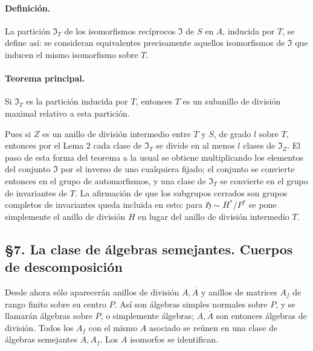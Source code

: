 \paragraph{Definición.}
La partición \(\mathfrak I_T\) de los isomorfismos recíprocos \(\mathfrak I\) de \(S\) en \(A\), inducida por \(T\), se define así: se consideran equivalentes precisamente aquellos isomorfismos de \(\mathfrak I\) que inducen el mismo isomorfismo sobre \(T\).

\paragraph{Teorema principal.}
Si \(\mathfrak I_T\) es la partición inducida por \(T\), entonces \(T\) es un subanillo de división maximal relativo a esta partición.

Pues si \(Z\) es un anillo de división intermedio entre \(T\) y \(S\), de grado \(l\) sobre \(T\), entonces por el Lema 2 cada clase de \(\mathfrak I_T\) se divide en al menos \(l\) clases de \(\mathfrak I_Z\). El paso de esta forma del teorema a la usual se obtiene multiplicando los elementos del conjunto \(\mathfrak I\) por el inverso de uno cualquiera fijado; el conjunto se convierte entonces en el grupo de automorfismos, y una clase de \(\mathfrak I_T\) se convierte en el grupo de invariantes de \(T\). La afirmación de que los subgrupos cerrados son grupos completos de invariantes queda incluida en esto: para \(\mathfrak H\sim H^*/P^*\) se pone simplemente el anillo de división \(H\) en lugar del anillo de división intermedio \(T\).

\subsection*{§7. La clase de álgebras semejantes. Cuerpos de descomposición}

Desde ahora sólo aparecerán anillos de división \(A,\overline A\) y anillos de matrices \(A_f\) de rango finito sobre su centro \(P\). Así son álgebras simples normales sobre \(P\), y se llamarán álgebras sobre \(P\), o simplemente álgebras; \(A,\overline A\) son entonces álgebras de división. Todos los \(A_f\) con el mismo \(A\) asociado se reúnen en una clase de álgebras semejantes \(A,A_f\). Los \(A\) isomorfos se identifican.

